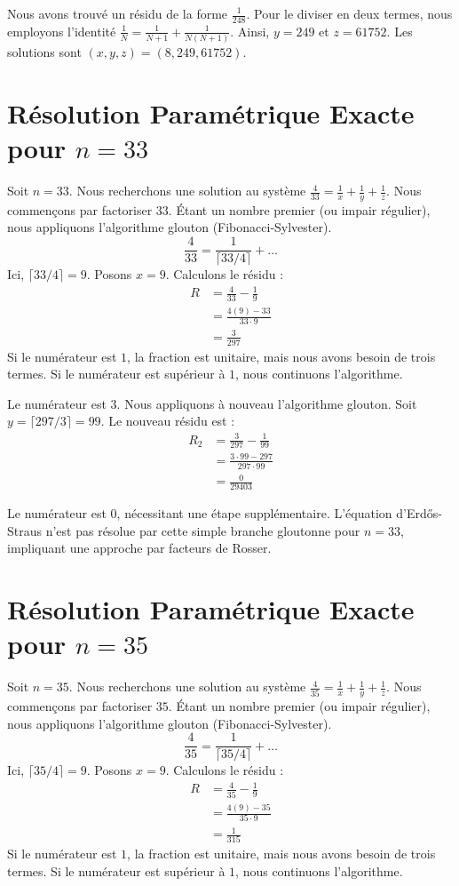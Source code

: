 \documentclass[11pt,a4paper]{article}
\begin{document}
Nous avons trouvé un résidu de la forme $\frac{1}{248}$. Pour le diviser en deux termes, nous employons l'identité $\frac{1}{N} = \frac{1}{N+1} + \frac{1}{N(N+1)}$.
Ainsi, $y = 249$ et $z = 61752$.
Les solutions sont $(x, y, z) = (8, 249, 61752)$.

\section{Résolution Paramétrique Exacte pour $n = 33$}
Soit $n = 33$. Nous recherchons une solution au système $\frac{4}{33} = \frac{1}{x} + \frac{1}{y} + \frac{1}{z}$.
Nous commençons par factoriser $33$. Étant un nombre premier (ou impair régulier), nous appliquons l'algorithme glouton (Fibonacci-Sylvester).
\begin{equation}
\frac{4}{33} = \frac{1}{\lceil 33/4 \rceil} + \ldots
\end{equation}
Ici, $\lceil 33/4 \rceil = 9$. Posons $x = 9$.
Calculons le résidu :
\begin{align*}
R &= \frac{4}{33} - \frac{1}{9} \\
&= \frac{4(9) - 33}{33 \cdot 9} \\
&= \frac{3}{297}
\end{align*}
Si le numérateur est $1$, la fraction est unitaire, mais nous avons besoin de trois termes. Si le numérateur est supérieur à $1$, nous continuons l'algorithme.

Le numérateur est $3$. Nous appliquons à nouveau l'algorithme glouton.
Soit $y = \lceil 297/3 \rceil = 99$.
Le nouveau résidu est :
\begin{align*}
R_2 &= \frac{3}{297} - \frac{1}{99} \\
&= \frac{3 \cdot 99 - 297}{297 \cdot 99} \\
&= \frac{0}{29403}
\end{align*}

Le numérateur est $0$, nécessitant une étape supplémentaire. L'équation d'Erd\H{o}s-Straus n'est pas résolue par cette simple branche gloutonne pour $n=33$, impliquant une approche par facteurs de Rosser.

\section{Résolution Paramétrique Exacte pour $n = 35$}
Soit $n = 35$. Nous recherchons une solution au système $\frac{4}{35} = \frac{1}{x} + \frac{1}{y} + \frac{1}{z}$.
Nous commençons par factoriser $35$. Étant un nombre premier (ou impair régulier), nous appliquons l'algorithme glouton (Fibonacci-Sylvester).
\begin{equation}
\frac{4}{35} = \frac{1}{\lceil 35/4 \rceil} + \ldots
\end{equation}
Ici, $\lceil 35/4 \rceil = 9$. Posons $x = 9$.
Calculons le résidu :
\begin{align*}
R &= \frac{4}{35} - \frac{1}{9} \\
&= \frac{4(9) - 35}{35 \cdot 9} \\
&= \frac{1}{315}
\end{align*}
Si le numérateur est $1$, la fraction est unitaire, mais nous avons besoin de trois termes. Si le numérateur est supérieur à $1$, nous continuons l'algorithme.
\end{document}
